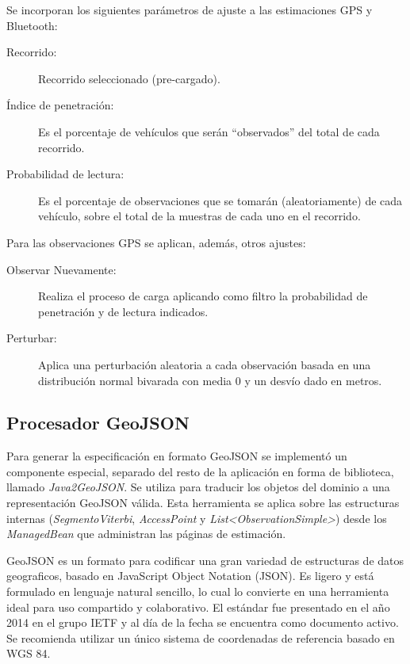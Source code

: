 Se incorporan los siguientes parámetros de ajuste a las estimaciones GPS y Bluetooth:

\begin{description}
    \item[Recorrido:] Recorrido seleccionado (pre-cargado).
    \item[Índice de penetración:] Es el porcentaje de vehículos que serán ``observados'' del total de cada recorrido.
    \item[Probabilidad de lectura:] Es el porcentaje de observaciones que se tomarán (aleatoriamente) de cada vehículo, sobre el total de la muestras de cada uno en el recorrido.
\end{description}

Para las observaciones GPS se aplican, además, otros ajustes:

\begin{description}
    \item[Observar Nuevamente:] Realiza el proceso de carga aplicando como filtro la probabilidad de penetración y de lectura indicados.
    \item[Perturbar:] Aplica una perturbación aleatoria a cada observación basada en una distribución normal bivarada con media 0 y un desvío dado en metros.
\end{description}
 
 \subsection{Procesador GeoJSON}
 Para generar la especificación en formato GeoJSON se implementó un componente especial, separado del resto de la aplicación en forma de biblioteca, llamado \textit{Java2GeoJSON}. Se utiliza para traducir los objetos del dominio a una representación GeoJSON válida. Esta herramienta se aplica sobre las estructuras internas (\textit{SegmentoViterbi}, \textit{AccessPoint} y \textit{List<ObservationSimple>}) desde los \textit{ManagedBean} que administran las páginas de estimación.
 
 GeoJSON es un formato para codificar una gran variedad de estructuras de datos geograficos, basado en JavaScript Object Notation (JSON). 
Es ligero y está formulado en lenguaje natural sencillo, lo cual lo convierte en una herramienta ideal para uso compartido y colaborativo. El estándar fue presentado en el año 2014 en el grupo IETF y al día de la fecha se encuentra como documento activo. Se recomienda utilizar un único sistema de coordenadas de referencia basado en WGS 84.

